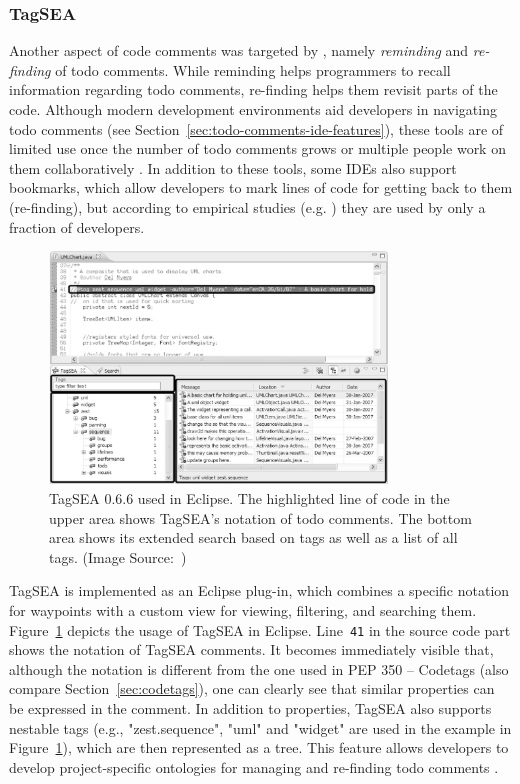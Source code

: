 \subsubsection{TagSEA}
\label{sec:tagsea}
Another aspect of code comments was targeted by \citeauthor{storey_how_2009} \cite{storey_how_2009}, namely \emph{reminding} and \emph{re-finding} of todo comments.
While reminding helps programmers to recall information regarding todo comments, re-finding helps them revisit parts of the code.
Although modern development environments aid developers in navigating todo comments (see Section~\ref{sec:todo-comments-ide-features}), these tools are of limited use once the number of todo comments grows or multiple people work on them collaboratively \cite{storey_how_2009}.
In addition to these tools, some IDEs also support bookmarks, which allow developers to mark lines of code for getting back to them (re-finding), but according to empirical studies (e.g. \cite{storey_how_2009, storey_todo_2008}) they are used by only a fraction of developers.
%
\begin{figure}[ht]
    \centering
    \includegraphics[width=0.8\textwidth]{images/tagsea}
    \caption{TagSEA 0.6.6 used in Eclipse. The highlighted line of code in the upper area shows TagSEA's notation of todo comments. The bottom area shows its extended search based on tags as well as a list of all tags. (Image Source:~\cite{storey_how_2009})}
    \label{fig:tagsea}
\end{figure}
%
TagSEA is implemented as an Eclipse plug-in, which combines a specific notation for waypoints with a custom view for viewing, filtering, and searching them.
Figure~\ref{fig:tagsea} depicts the usage of TagSEA in Eclipse.
Line~\verb|41| in the source code part shows the notation of TagSEA comments.
It becomes immediately visible that, although the notation is different from the one used in PEP 350 -- Codetags (also compare Section~\ref{sec:codetags}), one can clearly see that similar properties can be expressed in the comment.
In addition to properties, TagSEA also supports nestable tags (e.g., "zest.sequence", "uml" and "widget" are used in the example in Figure~\ref{fig:tagsea}), which are then represented as a tree.
This feature allows developers to develop project-specific ontologies for managing and re-finding todo comments \cite{storey_how_2009}.


